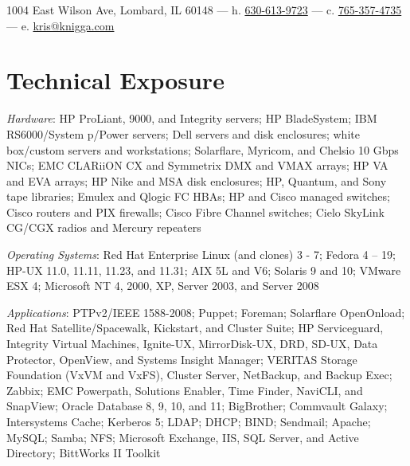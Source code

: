 \documentclass[9pt]{extarticle} %
\begin{document}



1004 East Wilson Ave, Lombard, IL 60148 \hfill --- \hfill h. \href{tel:630-613-9723}{630-613-9723} \hfill --- \hfill c. \href{tel:765-357-4735}{765-357-4735} \hfill --- \hfill e. \href{mailto:kris@knigga.com}{kris@knigga.com}


\section{Technical Exposure}

\textit{Hardware}: HP ProLiant, 9000, and Integrity servers; HP BladeSystem; IBM RS6000/System p/Power servers; Dell servers and disk enclosures; white box/custom servers and workstations; Solarflare, Myricom, and Chelsio 10 Gbps NICs; EMC CLARiiON CX and Symmetrix DMX and VMAX arrays; HP VA and EVA arrays; HP Nike and MSA disk enclosures; HP, Quantum, and Sony tape libraries; Emulex and Qlogic FC HBAs; HP and Cisco managed switches; Cisco routers and PIX firewalls; Cisco Fibre Channel switches; Cielo SkyLink CG/CGX radios and Mercury repeaters

\bigskip

\textit{Operating Systems}: Red Hat Enterprise Linux (and clones) 3 - 7; Fedora 4 -- 19; HP-UX 11.0, 11.11, 11.23, and 11.31; AIX 5L and V6; Solaris 9 and 10; VMware ESX 4; Microsoft NT 4, 2000, XP, Server 2003, and Server 2008

\bigskip

\textit{Applications}: PTPv2/IEEE 1588-2008; Puppet; Foreman; Solarflare OpenOnload; Red Hat Satellite/Spacewalk, Kickstart, and Cluster Suite; HP Serviceguard, Integrity Virtual Machines, Ignite-UX, MirrorDisk-UX, DRD, SD-UX, Data Protector, OpenView, and Systems Insight Manager; VERITAS Storage Foundation (VxVM and VxFS), Cluster Server, NetBackup, and Backup Exec; Zabbix; EMC Powerpath, Solutions Enabler, Time Finder, NaviCLI, and SnapView; Oracle Database 8, 9, 10, and 11; BigBrother; Commvault Galaxy; Intersystems Cache; Kerberos 5; LDAP; DHCP; BIND; Sendmail; Apache; MySQL; Samba; NFS; Microsoft Exchange, IIS, SQL Server, and Active Directory; BittWorks II Toolkit
\end{document}

